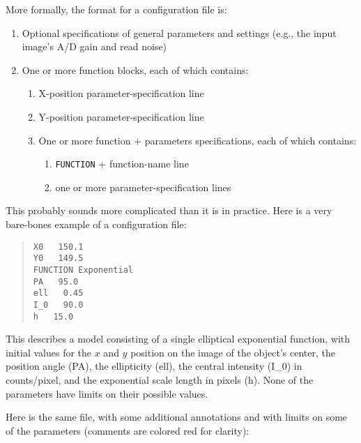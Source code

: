 \documentclass[10pt,a4paper,article]{memoir}
\begin{document}
\bigskip

More formally, the format for a configuration file is:
\begin{enumerate}
\item Optional specifications of general parameters and settings (e.g., the
input image's A/D gain and read noise)
\item One or more function blocks, each of which contains:
\begin{enumerate}
\item X-position parameter-specification line
\item Y-position parameter-specification line
\item One or more function + parameters specifications, each of which contains:
\begin{enumerate}
\item \texttt{FUNCTION} + function-name line
\item one or more parameter-specification lines
\end{enumerate}
\end{enumerate}
\end{enumerate}

This probably sounds more complicated than it is in practice.
Here is a very bare-bones example of a configuration file:

\begin{quote}
  \texttt{X0  ~  150.1}\\
  \texttt{Y0  ~  149.5}\\
  \texttt{FUNCTION   Exponential}\\
  \texttt{PA  ~  95.0}\\
  \texttt{ell  ~  0.45}\\
  \texttt{I\_0 ~  90.0}\\
  \texttt{h   ~  15.0}\\
\end{quote}

This describes a model consisting of a single elliptical exponential
function, with initial values for the $x$ and $y$ position on the image
of the object's center, the position angle (PA), the ellipticity (ell),
the central intensity (I\_0) in counts/pixel, and the exponential scale
length in pixels (h). None of the parameters have limits on their
possible values.

Here is the same file, with some additional annotations and with limits on
some of the parameters (comments are colored red for clarity):
\end{document}
